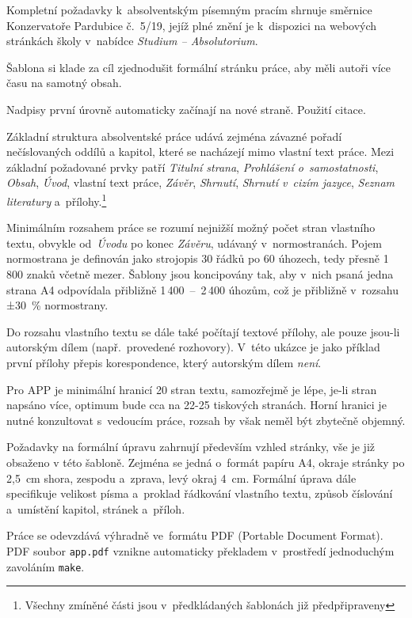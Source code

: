 Kompletní požadavky k~absolventským písemným pracím shrnuje směrnice
Konzervatoře Pardubice č.~5/19, jejíž plné znění je k~dispozici na webových
stránkách školy v~nabídce \textit{Studium – Absolutorium}.
 
Šablona si klade za cíl zjednodušit formální stránku práce, aby měli autoři
více času na samotný obsah.


Nadpisy první úrovně automaticky začínají na nové straně.
Použití citace.~\cite{harry}


Základní struktura absolventské práce udává zejména závazné pořadí nečíslovaných
oddílů a kapitol, které se nacházejí mimo vlastní text práce. Mezi základní
požadované prvky patří \textit{Titulní strana}, \textit{Prohlášení
o~samostatnosti}, \textit{Obsah}, \textit{Úvod}, vlastní text práce,
\textit{Závěr}, \textit{Shrnutí}, \textit{Shrnutí v~cizím jazyce},
\textit{Seznam literatury} a~přílohy.\footnote{Všechny zmíněné části jsou
v~předkládaných šablonách již předpřipraveny}

Minimálním rozsahem práce se rozumí nejnižší možný počet stran vlastního textu,
obvykle od~\textit{Úvodu} po konec \textit{Závěru}, udávaný v~normostranách.
Pojem normostrana je definován jako strojopis 30 řádků po 60 úhozech, tedy
přesně 1\,800 znaků včetně mezer. Šablony jsou koncipovány tak, aby v~nich psaná
jedna strana A4 odpovídala přibližně 1\,400~–~2\,400 úhozům, což je přibližně
v~rozsahu ±30~\% normostrany.

Do rozsahu vlastního textu se dále také počítají textové přílohy, ale pouze
jsou-li autorským dílem (např.~provedené rozhovory). V~této ukázce je jako
příklad první přílohy přepis korespondence, který autorským dílem \textit{není}.

Pro APP je minimální hranicí 20 stran textu, samozřejmě je lépe, je-li stran
napsáno více, optimum bude cca na 22-25 tiskových stranách. Horní hranici je
nutné konzultovat s~vedoucím práce, rozsah by však neměl být zbytečně objemný.

Požadavky na formální úpravu zahrnují především vzhled stránky, vše je již
obsaženo v této šabloně. Zejména se jedná o~formát papíru A4, okraje stránky
po 2,5~cm shora, zespodu a~zprava, levý okraj 4~cm.  Formální úprava dále
specifikuje velikost písma a~proklad řádkování vlastního textu, způsob číslování
a~umístění kapitol, stránek a~příloh.

Práce se odevzdává výhradně ve~formátu PDF (Portable Document Format). PDF
soubor \texttt{app.pdf} vznikne automaticky překladem v~prostředí \XeLaTeX
jednoduchým zavoláním \texttt{make}.

